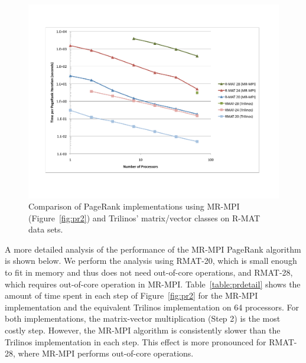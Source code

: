 \begin{figure}[htb]
\includegraphics[width=\textwidth]{fig_pagerank.pdf}
\caption{Comparison of PageRank implementations using 
MR-MPI (Figure~\ref{fig:pr2}) and 
Trilinos' matrix/vector classes on R-MAT data sets.}
\label{f:pr}
\end{figure}


A more detailed analysis of the performance of the MR-MPI PageRank
algorithm is shown below.  We perform the analysis using RMAT-20,
which is small enough to fit in memory and thus does not need
out-of-core operations, and RMAT-28, which requires out-of-core
operation in MR-MPI.  Table~\ref{table:prdetail} shows the amount of
time spent in each step of Figure~\ref{fig:pr2} for the MR-MPI
implementation and the equivalent Trilinos implementation on 64 processors.  For both
implementations, the matrix-vector multiplication (Step 2) is the most
costly step.  However, the MR-MPI algorithm is consistently slower
than the Trilinos implementation in each step.  This effect is more
pronounced for RMAT-28, where MR-MPI performs out-of-core operations.

